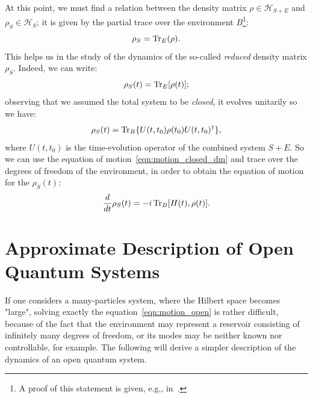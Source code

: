 At this point, we must find a relation between the density matrix $\rho \in \mathcal{H}_{S+E}$ and $\rho_S \in \mathcal{H}_S$; it is given by the partial trace over the environment $B$\footnote{A proof of this statement is given, e.g., in~\cite{nielsen_chuang}.}:
\begin{equation}
    \rho_S = \operatorname{Tr}_E(\rho).
\end{equation}
This helps us in the study of the dynamics of the so-called \emph{reduced} density matrix $\rho_S$. Indeed, we can write:
\begin{equation}
    \rho_S(t) = \operatorname{Tr}_E[\rho(t)];
\end{equation}
observing that we assumed the total system to be \emph{closed}, it evolves unitarily so we have:
\begin{equation}
    \rho_S(t) = \operatorname{Tr}_B\{U(t, t_0)\rho(t_0)U(t, t_0)^\dagger\},
\end{equation}
where $U(t, t_0)$ is the time-evolution operator of the combined system $S+E$. So we can use the equation of motion~\ref{eqn:motion_closed_dm} and trace over the degrees of freedom of the environment, in order to obtain the equation of motion for the $\rho_S(t)$:
\begin{equation}
\label{eqn:motion_open}
    \frac{d}{dt}\rho_S(t) = -i \operatorname{Tr}_B[H(t), \rho(t)].
\end{equation}


\section{Approximate Description of Open Quantum Systems}
\label{appr_dynam_oqs}
If one considers a many-particles system, where the Hilbert space becomes "large", solving exactly the equation~\ref{eqn:motion_open} is rather difficult, because of the fact that the environment may represent a reservoir consisting of infinitely many degrees of freedom, or its modes may be neither known nor controllable, for example. The following will derive a simpler description of the dynamics of an open quantum system. 

